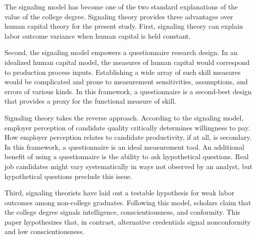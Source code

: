 \documentclass[review]{elsarticle}
\begin{document}
The signaling model has become one of the two standard explanations of the value of the college degree.
Signaling theory provides three advantages over human capital theory for the present study.
First, signaling theory can explain labor outcome variance when human capital is held constant.

Second, the signaling model empowers a questionnaire research design.
In an idealized human capital model, the measures of human capital would correspond to production process inputs.
Establishing a wide array of such skill measures would be complicated and prone to measurement sensitivities, assumptions, and errors of various kinds.
In this framework, a questionnaire is a second-best design that provides a proxy for the functional measure of skill.

Signaling theory takes the reverse approach.
According to the signaling model, employer perception of candidate quality critically determines willingness to pay.
How employer perception relates to candidate productivity, if at all, is secondary.
In this framework, a questionnaire is an ideal measurement tool.
An additional benefit of using a questionnaire is the ability to ask hypothetical questions.
Real job candidates might vary systematically in ways not observed by an analyst,
but hypothetical questions preclude this issue.

Third, signaling theorists have laid out a testable hypothesis for weak labor outcomes among non-college graduates.
Following this model, scholars claim that the college degree signals intelligence, conscientiousness, and conformity\cite{caplan2018case}.
This paper hypothesizes that, in contrast, alternative credentials signal nonconformity and low conscientiousness.

\end{document}
